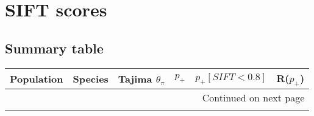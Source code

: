 \documentclass{article}
\begin{document}
    

    \section{SIFT scores}\label{sec:sift-scores}

    \subsection{Summary table}\label{subsec:summary-table-sift-scores}

    \begin{center}
        \footnotesize
        \begin{longtable}{|l|l|r|r|r|r|}
            \toprule
            Population           & Species             & Tajima $\theta_{\pi}$ & $p_+$    & $p_+ [ SIFT < 0.8]$ & R($p_+$) \\
            \midrule
            \endhead
            \midrule
            \multicolumn{6}{r}{{Continued on next page}} \\
            \midrule
            \endfoot


\end{longtable}
\end{center}
\end{document}
